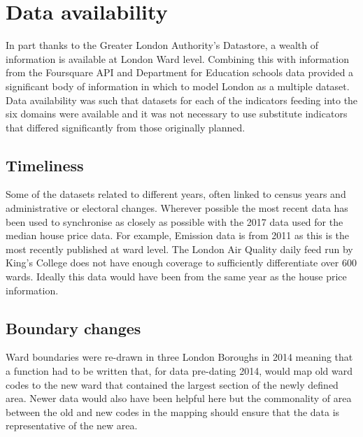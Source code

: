 \section{Data availability}

In part thanks to the Greater London Authority’s Datastore, a wealth of information is available at London Ward level. Combining this with information from the Foursquare API and Department for Education schools data provided a significant body of information in which to model London as a multiple dataset.
Data availability was such that datasets for each of the indicators feeding into the six domains were available and it was not necessary to use substitute indicators that differed significantly from those originally planned. 

\subsection{Timeliness}

Some of the datasets related to different years, often linked to census years and administrative or electoral changes.
Wherever possible the most recent data has been used to synchronise as closely as possible with the 2017 data used for the median house price data. For example, Emission data is from 2011 as this is the most recently published at ward level. The London Air Quality daily feed run by King’s College does not have enough coverage to sufficiently differentiate over 600 wards. Ideally this data would have been from the same year as the house price information.


\subsection{Boundary changes}
Ward boundaries were re-drawn in three London Boroughs in 2014 meaning that a function had to be written that, for data pre-dating 2014, would map old ward codes to the new ward that contained the largest section of the newly defined area. Newer data would also have been helpful here but the commonality of area between the old and new codes in the mapping should ensure that the data is representative of the new area.


